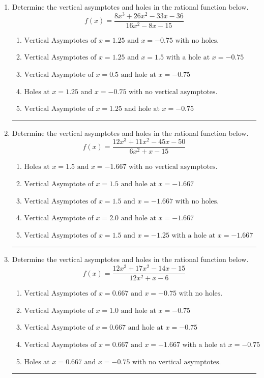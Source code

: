 \documentclass[14pt]{extbook}
\newcommand{\litem}[1]{\item#1\hspace*{-1cm}\rule{\textwidth}{0.4pt}}
\begin{document}
\begin{enumerate}
{\begin{enumerate}[label=\Alph*.]
\end{enumerate} }
\litem{
Determine the vertical asymptotes and holes in the rational function below.\[ f(x) = \frac{8x^{3} +26 x^{2} -33 x -36}{16x^{2} -8 x -15} \]\begin{enumerate}[label=\Alph*.]
\item \( \text{Vertical Asymptotes of } x = 1.25 \text{ and } x = -0.75 \text{ with no holes.} \)
\item \( \text{Vertical Asymptotes of } x = 1.25 \text{ and } x = 1.5 \text{ with a hole at } x = -0.75 \)
\item \( \text{Vertical Asymptote of } x = 0.5 \text{ and hole at } x = -0.75 \)
\item \( \text{Holes at } x = 1.25 \text{ and } x = -0.75 \text{ with no vertical asymptotes.} \)
\item \( \text{Vertical Asymptote of } x = 1.25 \text{ and hole at } x = -0.75 \)

\end{enumerate} }
\litem{
Determine the vertical asymptotes and holes in the rational function below.\[ f(x) = \frac{12x^{3} +11 x^{2} -45 x -50}{6x^{2} +x -15} \]\begin{enumerate}[label=\Alph*.]
\item \( \text{Holes at } x = 1.5 \text{ and } x = -1.667 \text{ with no vertical asymptotes.} \)
\item \( \text{Vertical Asymptote of } x = 1.5 \text{ and hole at } x = -1.667 \)
\item \( \text{Vertical Asymptotes of } x = 1.5 \text{ and } x = -1.667 \text{ with no holes.} \)
\item \( \text{Vertical Asymptote of } x = 2.0 \text{ and hole at } x = -1.667 \)
\item \( \text{Vertical Asymptotes of } x = 1.5 \text{ and } x = -1.25 \text{ with a hole at } x = -1.667 \)

\end{enumerate} }
\litem{
Determine the vertical asymptotes and holes in the rational function below.\[ f(x) = \frac{12x^{3} +17 x^{2} -14 x -15}{12x^{2} +x -6} \]\begin{enumerate}[label=\Alph*.]
\item \( \text{Vertical Asymptotes of } x = 0.667 \text{ and } x = -0.75 \text{ with no holes.} \)
\item \( \text{Vertical Asymptote of } x = 1.0 \text{ and hole at } x = -0.75 \)
\item \( \text{Vertical Asymptote of } x = 0.667 \text{ and hole at } x = -0.75 \)
\item \( \text{Vertical Asymptotes of } x = 0.667 \text{ and } x = -1.667 \text{ with a hole at } x = -0.75 \)
\item \( \text{Holes at } x = 0.667 \text{ and } x = -0.75 \text{ with no vertical asymptotes.} \)


\end{enumerate}}
\end{enumerate}
\end{document}
